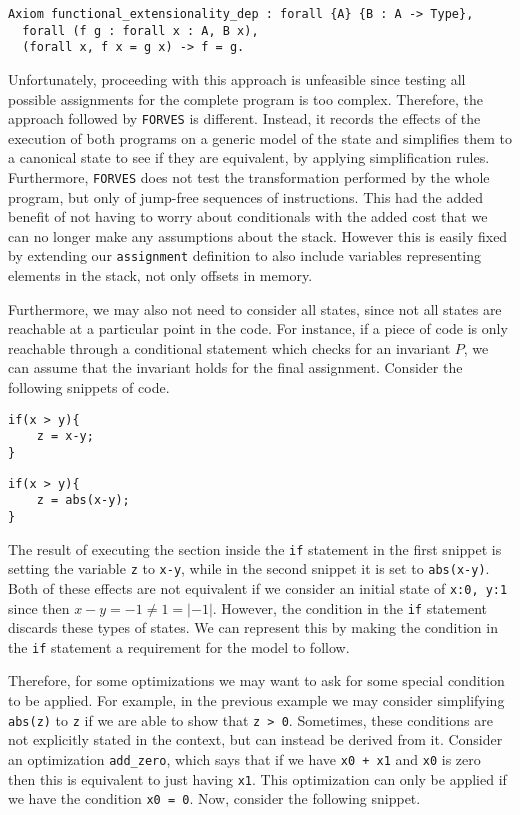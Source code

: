 \begin{verbatim}
Axiom functional_extensionality_dep : forall {A} {B : A -> Type},
  forall (f g : forall x : A, B x),
  (forall x, f x = g x) -> f = g.
\end{verbatim}

Unfortunately, proceeding with this approach is unfeasible since testing all possible assignments for
the complete program is too complex. Therefore, the approach followed by \verb|FORVES| is different.
Instead, it records the effects of the execution of both programs on a generic model of the state and
simplifies them to a canonical state to see if they are equivalent, by applying simplification rules.
Furthermore, \verb|FORVES| does not test the transformation performed by the whole program, but only of 
jump-free sequences of instructions. This had the added benefit of not having to worry about 
conditionals with the added cost that we can no longer make any assumptions about the stack. However 
this is easily fixed by extending our \texttt{assignment} definition to also include 
variables representing elements in the stack, not only offsets in memory.

Furthermore, we may also not need to consider all states, since not all states are reachable at a 
particular point in the code. For instance, if a piece of code is only reachable through a
conditional statement which checks for an invariant $P$, we can assume that the invariant holds for the 
final assignment. Consider the following snippets of code.

\begin{verbatim}
if(x > y){
    z = x-y;
}
\end{verbatim}
\begin{verbatim}
if(x > y){
    z = abs(x-y);
}
\end{verbatim}

The result of executing the section inside the \texttt{if} statement in the first snippet is 
setting the variable \texttt{z} to \texttt{x-y}, while in the second snippet it is
set to \texttt{abs(x-y)}. Both of these effects are not equivalent if we consider an initial
state of \texttt{{x:0, y:1}} since then ${x-y} = -1 \ne 1 = \lvert-1\rvert$. However,
the condition in the \texttt{if} statement discards these types of states. We can represent
this by making the condition in the \texttt{if} statement a requirement for the model to 
follow.

Therefore, for some optimizations we may want to ask for some special condition to be applied.
For example, in the previous example we may consider simplifying \texttt{abs(z)} to
\texttt{z} if we are able to show that \texttt{z > 0}. Sometimes, these conditions
are not explicitly stated in the context, but can instead be derived from it. Consider an optimization
\texttt{add_zero}, which says that if we have \texttt{x0 + x1} and 
\texttt{x0} is zero then this is equivalent to just having \texttt{x1}. This 
optimization can only be applied if we have the condition \texttt{x0 = 0}. Now, consider the
following snippet.

